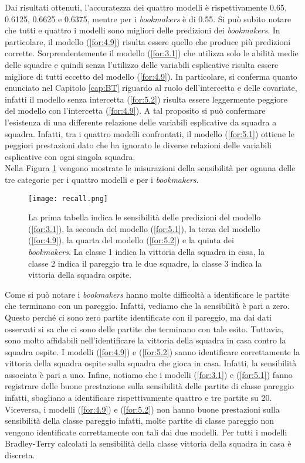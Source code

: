 Dai risultati ottenuti, l'accuratezza dei quattro modelli è rispettivamente 0.65, 0.6125, 0.6625 e 0.6375, mentre per i \emph{bookmakers} è di 0.55. Si può subito notare che tutti e quattro i modelli sono migliori delle predizioni dei \emph{bookmakers}. In particolare, il modello (\ref{for:4.9}) risulta essere quello che produce più predizioni corrette. Sorprendentemente il modello (\ref{for:3.1}) che utilizza solo le abilità medie delle squadre e quindi senza l'utilizzo delle variabili esplicative risulta essere migliore di tutti eccetto del modello (\ref{for:4.9}). In particolare, si conferma quanto enunciato nel Capitolo \ref{cap:BT} riguardo al ruolo dell'intercetta e delle covariate, infatti il modello senza intercetta (\ref{for:5.2}) risulta essere leggermente peggiore del modello con l'intercetta (\ref{for:4.9}). A tal proposito si può confermare l'esistenza di una differente relazione delle variabili esplicative da squadra a squadra. Infatti, tra i quattro modelli confrontati, il modello (\ref{for:5.1}) ottiene le peggiori prestazioni dato che ha ignorato le diverse relazioni delle variabili esplicative con ogni singola squadra.\\
Nella Figura \ref{fig:recall} vengono mostrate le misurazioni della sensibilità per ognuna delle tre categorie per i quattro modelli e per i \emph{bookmakers}.\\
\begin{figure}[h]
	\begin{center}
		\texttt{[image: recall.png]}
		\caption{La prima tabella indica le sensibilità delle predizioni del modello (\ref{for:3.1}), la seconda del modello (\ref{for:5.1}), la terza del modello (\ref{for:4.9}), la quarta del modello (\ref{for:5.2}) e la quinta dei \emph{bookmakers}. La classe 1 indica la vittoria della squadra in casa, la classe 2 indica il pareggio tra le due squadre, la classe 3 indica la vittoria della squadra ospite. }\label{fig:recall}
	\end{center}
\end{figure}
Come si può notare i \emph{bookmakers} hanno molte difficoltà a identificare le partite che terminano con un pareggio. Infatti, vediamo che la sensibilità è pari a zero. Questo perché ci sono zero partite identificate con il pareggio, ma dai dati osservati si sa che ci sono delle partite che terminano con tale esito. Tuttavia, sono molto affidabili nell’identificare la vittoria della squadra in casa contro la squadra ospite. I modelli (\ref{for:4.9}) e (\ref{for:5.2}) sanno identificare correttamente la vittoria della squadra ospite sulla squadra che gioca in casa. Infatti, la sensibilità associata è pari a uno. Infine, notiamo che i modelli (\ref{for:3.1}) e (\ref{for:5.1}) fanno registrare delle buone prestazione sulla sensibilità delle partite di classe pareggio infatti, sbagliano a identificare rispettivamente quattro e tre partite su 20. Viceversa, i modelli (\ref{for:4.9}) e (\ref{for:5.2}) non hanno buone prestazioni sulla sensibilità della classe pareggio infatti, molte partite di classe pareggio non vengono identificate correttamente con tali dai due modelli. Per tutti i modelli Bradley-Terry calcolati la sensibilità della classe vittoria della squadra in casa è discreta.\\ 
